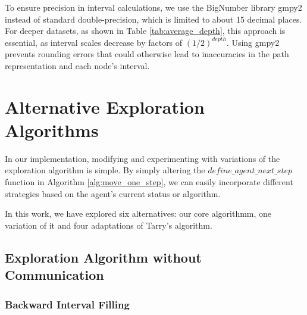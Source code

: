 To ensure precision in interval calculations, we use the BigNumber library gmpy2 \cite{Martelli2015} instead of standard double-precision, which is limited to about 15 decimal places. For deeper datasets, as shown in Table \ref{tab:average_depth}, this approach is essential, as interval scales decrease by factors of $(1/2)^{depth}$. Using gmpy2 prevents rounding errors that could otherwise lead to inaccuracies in the path representation and each node's interval.

\section{Alternative Exploration Algorithms}
\label{section_method_alt_exploration_alg}

In our implementation, modifying and experimenting with variations of the exploration algorithm is simple.
By simply altering the $define\_agent\_next\_step$ function in Algorithm \ref{alg:move_one_step}, we can easily incorporate different strategies based on the agent's current status or algorithm.

In this work, we have explored six alternatives: our core algorithmm, one variation of it and four adaptations of Tarry's algorithm.

\subsection{Exploration Algorithm without Communication}
\label{section_method_zero_comm}

\subsubsection{Backward Interval Filling}
\label{section_backward_interval}

